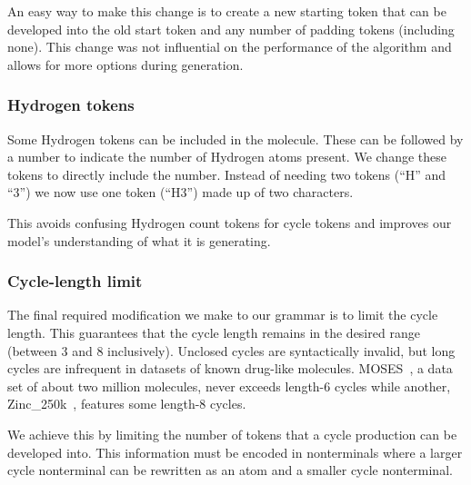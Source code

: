 \documentclass[../Document.tex]{subfiles}
\begin{document}
An easy way to make this change is to create a new starting token that can be developed into the old start token and any number of padding tokens (including none). This change was not influential on the performance of the algorithm and allows for more options during generation.


\subsubsection{Hydrogen tokens}
Some Hydrogen tokens can be included in the molecule. These can be followed by a number to indicate the number of Hydrogen atoms present. We change these tokens to directly include the number.
Instead of needing two tokens (``H'' and ``3'') we now use one token (``H3'') made up of two characters.



This avoids confusing Hydrogen count tokens for cycle tokens and improves our model's understanding of what it is generating.


\subsubsection{Cycle-length limit}
The final required modification we make to our grammar is to limit the cycle length.
This guarantees that the cycle length remains in the desired range (between 3 and 8 inclusively). 
Unclosed cycles are syntactically invalid, but long cycles are infrequent in datasets of known drug-like molecules.
MOSES~\cite{MOSES}, a data set of about two million molecules, never exceeds length-6 cycles while another, Zinc\_250k~\cite{Akhmetshin2021}, features some length-8 cycles. 

We achieve this by limiting the number of tokens that a cycle production can be developed into. This information must be encoded in nonterminals where a larger cycle nonterminal can be rewritten as an atom and a smaller cycle nonterminal.
\end{document}
